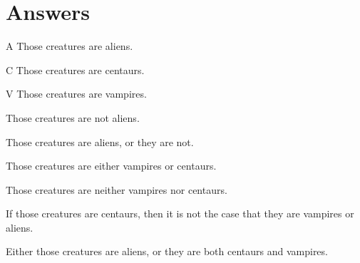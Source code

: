 




\section{Answers}
\setcounter{ProbPart}{0}

\problempart 
	\begin{ekey}
		\item[A] Those creatures are aliens. 
		\item[C] Those creatures are centaurs. 
		\item[V] Those creatures are vampires.
	\end{ekey}
\begin{earg}
\item Those creatures are not aliens.
\item[] 
\item Those creatures are aliens, or they are not.
\item[]  
\item Those creatures are either vampires or centaurs.
\item[] 
\item Those creatures are neither vampires nor centaurs.
\item[] 
\item If those creatures are centaurs, then it is not the case that they are vampires or aliens.
\item[] 
\item Either those creatures are aliens, or they are both centaurs and vampires.
\item[] 
\end{earg}

